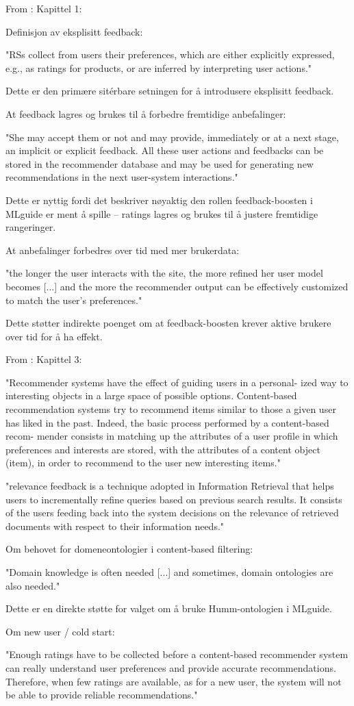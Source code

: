 From \parencite[Chapter~1]{ricci2010recommender_systems_handbook} :
Kapittel 1:


Definisjon av eksplisitt feedback:

"RSs collect from users their preferences, which are either explicitly expressed, e.g., as ratings for products, or are inferred by interpreting user actions."

Dette er den primære sitérbare setningen for å introdusere eksplisitt feedback.

At feedback lagres og brukes til å forbedre fremtidige anbefalinger:

"She may accept them or not and may provide, immediately or at a next stage, an implicit or explicit feedback. All these user actions and feedbacks can be stored in the recommender database and may be used for generating new recommendations in the next user-system interactions."

Dette er nyttig fordi det beskriver nøyaktig den rollen feedback-boosten i MLguide er ment å spille – ratings lagres og brukes til å justere fremtidige rangeringer.

At anbefalinger forbedres over tid med mer brukerdata:

"the longer the user interacts with the site, the more refined her user model becomes [...] and the more the recommender output can be effectively customized to match the user's preferences."

Dette støtter indirekte poenget om at feedback-boosten krever aktive brukere over tid for å ha effekt.

From \parencite[Chapter~3]{ricci2010recommender_systems_handbook} :
Kapittel 3:

"Recommender systems have the effect of guiding users in a personal-
ized way to interesting objects in a large space of possible options. Content-based
recommendation systems try to recommend items similar to those a given user has
liked in the past. Indeed, the basic process performed by a content-based recom-
mender consists in matching up the attributes of a user profile in which preferences
and interests are stored, with the attributes of a content object (item), in order to
recommend to the user new interesting items."

"relevance feedback is a technique adopted in Information Retrieval that helps users to incrementally refine queries based on previous search results. It consists of the users feeding back into the system decisions on the relevance of retrieved documents with respect to their information needs."

Om behovet for domeneontologier i content-based filtering:

"Domain knowledge is often needed [...] and sometimes, domain ontologies are also needed."

Dette er en direkte støtte for valget om å bruke Humm-ontologien i MLguide.

Om new user / cold start:

"Enough ratings have to be collected before a content-based recommender system can really understand user preferences and provide accurate recommendations. Therefore, when few ratings are available, as for a new user, the system will not be able to provide reliable recommendations."